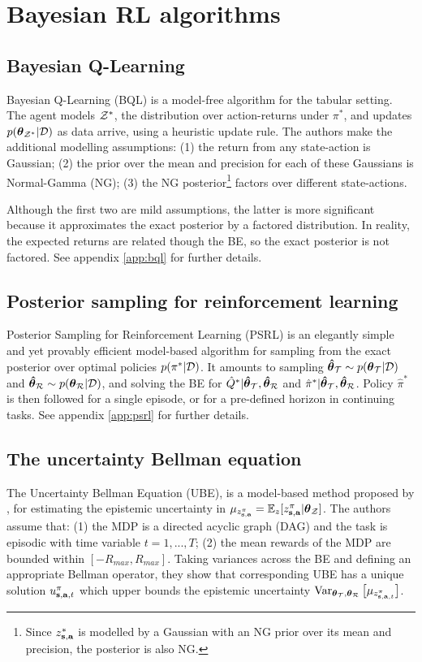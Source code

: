 \documentclass{article}
\begin{document}
\section{Bayesian RL algorithms}
\subsection{Bayesian Q-Learning}
Bayesian Q-Learning (BQL) \citep{bqlearning} is a model-free algorithm for the tabular setting. The agent models $\mathcal{Z}^*$, the distribution over action-returns under $\pi^*$, and updates $p(\boldsymbol{\theta}_{\mathcal{Z}^*} | \mathcal{D})$ as data arrive, using a heuristic update rule. The authors make the additional modelling assumptions: (1) the return from any state-action is Gaussian; (2) the prior over the mean and precision for each of these Gaussians is Normal-Gamma (NG); (3) the NG posterior\footnote{Since $z^*_{\mathbf{s}, \mathbf{a}}$ is modelled by a Gaussian with an NG prior over its mean and precision, the posterior is also NG.} factors over different state-actions.

Although the first two are mild assumptions, the latter is more significant because it approximates the exact posterior by a factored distribution. In reality, the expected returns are related though the BE, so the exact posterior is not factored. See appendix \ref{app:bql} for further details.

\subsection{Posterior sampling for reinforcement learning}

Posterior Sampling for Reinforcement Learning (PSRL) \citep{psrl} is an elegantly simple and yet provably efficient model-based algorithm for sampling from the exact posterior over optimal policies $p(\pi^* | \mathcal{D})$. It amounts to sampling $\boldsymbol{\hat{\theta}}_{\mathcal{T}} \sim p(\boldsymbol{\theta}_{\mathcal{T}} | \mathcal{D})$ and $\boldsymbol{\hat{\theta}}_{\mathcal{R}} \sim p(\boldsymbol{\theta}_{\mathcal{R}} | \mathcal{D})$, and solving the BE for $\hat{Q}^* | \boldsymbol{\hat{\theta}}_{\mathcal{T}}, \boldsymbol{\hat{\theta}}_{\mathcal{R}} $ and $\hat{\pi}^* | \boldsymbol{\hat{\theta}}_{\mathcal{T}}, \boldsymbol{\hat{\theta}}_{\mathcal{R}}$. Policy $\hat{\pi}^*$ is then followed for a single episode, or for a pre-defined horizon in continuing tasks. See appendix \ref{app:psrl} for further details.

\subsection{The uncertainty Bellman equation}
The Uncertainty Bellman Equation (UBE), is a model-based method proposed by \cite{ube}, for estimating the epistemic uncertainty in $\mu_{z^\pi_{\mathbf{s}, \mathbf{a}}} = \operatorname{\mathbb{E}}_z [z^\pi_{\mathbf{s}, \mathbf{a}} | \boldsymbol{\theta}_{\mathcal{Z}}]$. The authors assume that: (1) the MDP is a directed acyclic graph (DAG) and the task is episodic with time variable $t = 1, ..., T$; (2) the mean rewards of the MDP are bounded within $[-R_{max}, R_{max}]$. Taking variances across the BE and defining an appropriate Bellman operator, they show that corresponding UBE has a unique solution $u_{\mathbf{s}, \mathbf{a}, t}^\pi$ which upper bounds the epistemic uncertainty $\operatorname{\text{Var}}_{\boldsymbol{\theta}_{\mathcal{T}}, \boldsymbol{\theta}_{\mathcal{R}}} \big[ \mu_{z^{\pi}_{\mathbf{s}, \mathbf{a}, t}} \big]$.
\end{document}
